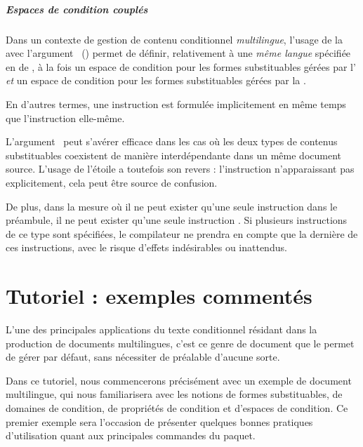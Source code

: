 \documentclass{article}
\begin{document}
\subsubsection{Espaces de condition couplés}\label{CtDoc_Commandes_SetMiniCondiSpace_EspacesCouples}
Dans un contexte de gestion de contenu conditionnel \emph{multilingue}, l'usage de la  avec l'argument~\val{*} () permet de définir, relativement à une \emph{même langue} spécifiée en  de , à la fois un espace de condition pour les formes substituables gérées par l' \emph{et} un espace de condition pour les formes substituables gérées par la .

En d'autres termes, une instruction  est formulée implicitement en même temps que l'instruction  elle-même.

L'argument~\val{*} peut s'avérer efficace dans les cas où les deux types de contenus substituables coexistent de manière interdépendante dans un même document source. L'usage de l'étoile a toutefois son revers : l'instruction  n'apparaissant pas explicitement, cela peut être source de confusion.

De plus, dans la mesure où il ne peut exister qu'une seule instruction  dans le préambule, il ne peut exister qu'une seule instruction . Si plusieurs instructions de ce type sont spécifiées, le compilateur ne prendra en compte que la dernière de ces instructions, avec le risque d'effets indésirables ou inattendus.

\part{Tutoriel : exemples commentés}\label{CtDoc_Tuto}
L'une des principales applications du texte conditionnel résidant dans la production de documents multilingues, c'est ce genre de document que le  permet de gérer par défaut, sans nécessiter de préalable d'aucune sorte.

Dans ce tutoriel, nous commencerons précisément avec un exemple de document multilingue, qui nous familiarisera avec les notions de formes substituables, de domaines de condition, de propriétés de condition et d'espaces de condition. Ce premier exemple sera l'occasion de présenter quelques bonnes pratiques d'utilisation quant aux principales commandes du paquet.
\end{document}
